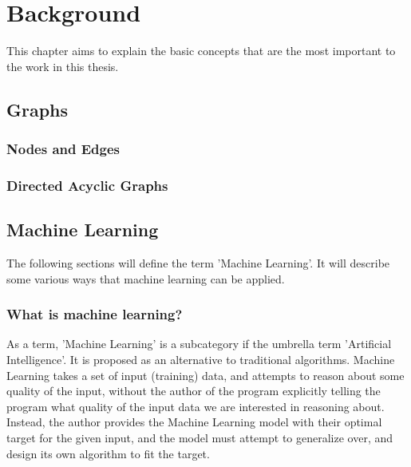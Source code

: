 \chapter{Background}

This chapter aims to explain the basic concepts that are the most important to the work in this thesis.



\section{Graphs}
\subsection{Nodes and Edges}
\subsection{Directed Acyclic Graphs}




\section{Machine Learning}

The following sections will define the term 'Machine Learning'. 
It will describe some various ways that machine learning can be applied.



\subsection{What is machine learning?}

As a term, 'Machine Learning' is a subcategory if the umbrella term 'Artificial Intelligence'.
It is proposed as an alternative to traditional algorithms. 
Machine Learning takes a set of input (training) data, and attempts to reason about some quality of the input, 
without the author of the program explicitly telling the program what quality of the input data we are interested in reasoning about.
Instead, the author provides the Machine Learning model with their optimal target for the given input,
and the model must attempt to generalize over, and design its own algorithm to fit the target.


